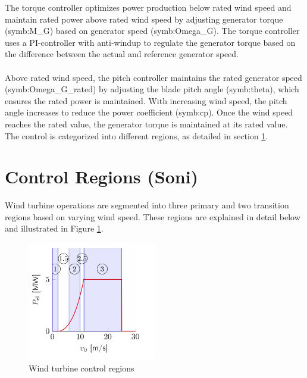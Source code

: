 The torque controller optimizes power production below rated wind speed and maintain rated power above rated wind speed by adjusting generator torque (\gls{symb:M_G}) based on generator speed (\gls{symb:Omega_G}).
The torque controller uses a PI-controller with anti-windup to regulate the generator torque based on the difference between the actual and reference generator speed.
\\
\\
Above rated wind speed, the pitch controller maintains the rated generator speed (\gls{symb:Omega_G_rated}) by adjusting the blade pitch angle (\gls{symb:theta}), which ensures the rated power is maintained.
With increasing wind speed, the pitch angle increases to reduce the power coefficient (\gls{symb:cp}).
Once the wind speed reaches the rated value, the generator torque is maintained at its rated value.
The control is categorized into different regions, as detailed in section \ref{control regions}.
\section{Control Regions (Soni)} \label{control regions}

Wind turbine operations are segmented into three primary and two transition regions based on varying wind speed. These regions are explained in detail below and illustrated in Figure \ref{fig:control regions}.

\begin{figure}[h]
	\centering
	\includegraphics[width=0.5\textwidth]{Figures/Figure_2.jpg}
	\caption{Wind turbine control regions \cite{SchlipfLecture}}
	\label{fig:control regions} 
\end{figure}

